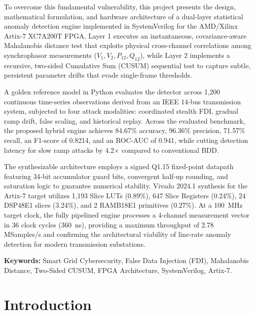 \documentclass[12pt,a4paper]{report}
\begin{document}
To overcome this fundamental vulnerability, this project presents the
design, mathematical formulation, and hardware architecture of a dual-layer
statistical anomaly detection engine implemented in SystemVerilog for the
AMD/Xilinx Artix-7 XC7A200T FPGA. Layer 1 executes an instantaneous,
covariance-aware Mahalanobis distance test that exploits physical cross-channel
correlations among synchrophasor measurements ($V_1, V_2, P_{12}, Q_{12}$),
while Layer 2 implements a recursive, two-sided Cumulative Sum (CUSUM) sequential
test to capture subtle, persistent parameter drifts that evade single-frame
thresholds.

A golden reference model in Python evaluates the detector across 1,200 continuous
time-series observations derived from an IEEE 14-bus transmission system,
subjected to four attack modalities: coordinated stealth FDI, gradual ramp drift,
false scaling, and historical replay. Across the evaluated benchmark, the proposed
hybrid engine achieves 84.67\% accuracy, 96.36\% precision, 71.57\% recall, an
F1-score of 0.8214, and an ROC-AUC of 0.941, while cutting detection latency for
slow ramp attacks by 4.2$\times$ compared to conventional BDD.

The synthesizable architecture employs a signed Q1.15 fixed-point datapath
featuring 34-bit accumulator guard bits, convergent half-up rounding, and
saturation logic to guarantee numerical stability. Vivado 2024.1 synthesis for
the Artix-7 target utilizes 1,193 Slice LUTs (0.89\%), 647 Slice Registers
(0.24\%), 24 DSP48E1 slices (3.24\%), and 2 RAMB18E1 primitives (0.27\%). At a
100~MHz target clock, the fully pipelined engine processes a 4-channel measurement
vector in 36 clock cycles (360~ns), providing a maximum throughput of 2.78
MSamples/s and confirming the architectural viability of line-rate anomaly
detection for modern transmission substations.

\vspace{0.8cm}
\noindent\textbf{Keywords:} Smart Grid Cybersecurity, False Data Injection (FDI),
Mahalanobis Distance, Two-Sided CUSUM, FPGA Architecture, SystemVerilog, Artix-7.

\clearpage
\tableofcontents
\listoffigures
\listoftables
\clearpage
{}


\chapter{Introduction}
\end{document}

